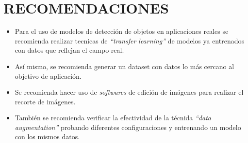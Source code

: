 \chapter*{RECOMENDACIONES}

\begin{itemize}
  \item Para el uso de modelos de detección de objetos en aplicaciones reales se recomienda realizar tecnicas de \textit{``transfer learning''} de modelos ya entrenados con datos que reflejan el campo real.
  \item Así mismo, se recomienda generar un dataset con datos lo más cercano al objetivo de aplicación.
  \item Se recomienda hacer uso de \textit{softwares} de edición de imágenes para realizar el recorte de imágenes.
  \item También se recomienda verificar la efectividad de la técnida \textit{``data augmentation''} probando diferentes configuraciones y entrenando un modelo con los mismos datos.
\end{itemize}